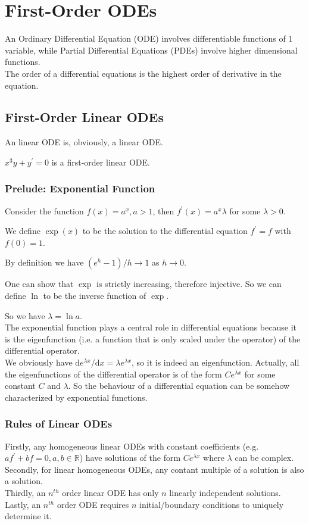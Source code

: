 \section{First-Order ODEs}
\begin{definition}
    An Ordinary Differential Equation (ODE) involves differentiable functions of $1$ variable, while Partial Differential Equations (PDEs) involve higher dimensional functions.\\
    The order of a differential equations is the highest order of derivative in the equation.
\end{definition}
\subsection{First-Order Linear ODEs}
An linear ODE is, obviously, a linear ODE.
\begin{example}
    $x^3y+y^\prime=0$ is a first-order linear ODE.
\end{example}
\subsubsection{Prelude: Exponential Function}
Consider the function $f(x)=a^x,a>1$, then $f^\prime(x)=a^x\lambda$ for some $\lambda>0$.
\begin{definition}
    We define $\exp(x)$ to be the solution to the differential equation $f^\prime=f$ with $f(0)=1$.
\end{definition}
By definition we have $(e^h-1)/h\to 1$ as $h\to 0$.
\begin{definition}
    One can show that $\exp$ is strictly increasing, therefore injective.
    So we can define $\ln$ to be the inverse function of $\exp$.
\end{definition}
So we have $\lambda=\ln a$.\\
The exponential function plays a central role in differential equations because it is the eigenfunction (i.e. a function that is only scaled under the operator) of the differential operator.\\
We obviously have $\mathrm de^{\lambda x}/\mathrm dx=\lambda e^{\lambda x}$, so it is indeed an eigenfunction.
Actually, all the eigenfunctions of the differential operator is of the form $Ce^{\lambda x}$ for some constant $C$ and $\lambda$.
So the behaviour of a differential equation can be somehow characterized by exponential functions.
\subsubsection{Rules of Linear ODEs}
Firstly, any homogeneous linear ODEs with constant coefficients (e.g. $af^\prime+bf=0, a,b\in\mathbb R$) have solutions of the form $Ce^{\lambda x}$ where $\lambda$ can be complex.\\
Secondly, for linear homogeneous ODEs, any contant multiple of a solution is also a solution.\\
Thirdly, an $n^{th}$ order linear ODE has only $n$ linearly independent solutions.\\
Lastly, an $n^{th}$ order ODE requires $n$ initial/boundary conditions to uniquely determine it.
